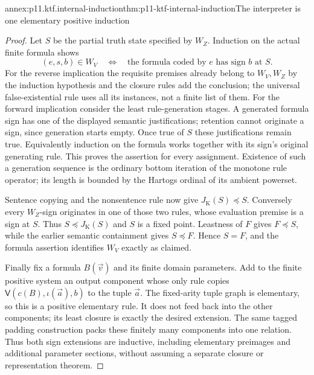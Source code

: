 \begin{annexitem}{annex:p11.ktf.internal-induction}{thm:p11-ktf-internal-induction}{The interpreter is one elementary positive induction}
\begin{proof}
Let \(S\) be the partial truth state specified by \(W_Z\).
Induction on the actual finite formula shows
\[
 (e,s,b)\in W_V
 \quad\Longleftrightarrow\quad
 \text{the formula coded by }e\text{ has sign }b\text{ at }S.
\]
For the reverse implication the requisite premises already belong to
\(W_V,W_Z\) by the induction hypothesis and the closure rules
add the conclusion; the universal false-existential rule uses all
its instances, not a finite list of them. For the forward implication
consider the least rule-generation stages. A generated formula sign
has one of the displayed semantic justifications; retention cannot
originate a sign, since generation starts empty. Once true of \(S\)
these justifications remain true. Equivalently induction on the formula
works together with its sign's original generating rule. This proves
the assertion for every assignment. Existence of such a generation
sequence is the ordinary bottom iteration of the monotone rule operator;
its length is bounded by the Hartogs ordinal of its ambient powerset.

Sentence copying and the nonsentence rule now give
\(J_{\mathrm K}(S)\preceq S\). Conversely every
\(W_Z\)-sign originates in one of those two rules, whose
evaluation premise is a sign at \(S\). Thus
\(S\preceq J_{\mathrm K}(S)\) and \(S\) is a fixed
point. Leastness of \(F\) gives \(F\preceq S\), while the
earlier semantic containment gives \(S\preceq F\). Hence \(S=F\),
and the formula assertion identifies \(W_V\) exactly as claimed.

Finally fix a formula \(B(\vec v)\) and its finite domain
parameters. Add to the finite positive system an output component
whose only rule copies
\(\mathsf V(c(B),\iota(\vec a),b)\) to the tuple
\(\vec a\). The fixed-arity tuple graph is elementary, so
this is a positive elementary rule. It does not feed back into the
other components; its least closure is exactly the desired extension.
The same tagged padding construction packs these finitely many
components into one relation. Thus both sign extensions are inductive,
including elementary preimages and additional parameter sections,
without assuming a separate closure or representation theorem.
\end{proof}
\end{annexitem}


